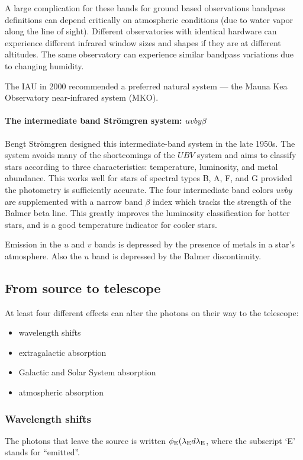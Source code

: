 A large complication for these bands for ground based observations
bandpass definitions can depend critically on atmospheric conditions
(due to water vapor along the line of sight). Different observatories
with identical hardware can experience different infrared window sizes
and shapes if they are at different altitudes. The same observatory
can experience similar bandpass variations due to changing humidity. 

The IAU in 2000 recommended a preferred natural system --- the Mauna
Kea Observatory near-infrared system (MKO).
\paragraph{The intermediate band Str\"omgren system: $uvby\beta$}
Bengt Str\"omgren designed this intermediate-band system in the late
1950s. The system avoids many of the shortcomings of the $UBV$ system
and aims to classify stars according to three characteristics:
temperature, luminosity, and metal abundance. This works well for
stars of spectral types B, A, F, and G provided the photometry is
sufficiently accurate. The four intermediate band colors $uvby$ are
supplemented with a narrow band $\beta$ index which tracks the
strength of the Balmer beta line. This greatly improves the
luminosity classification for hotter stars, and is a good temperature
indicator for cooler stars.

Emission in the $u$ and $v$ bands is depressed by the presence of
metals in a star's atmosphere. Also the $u$ band is depressed by the
Balmer discontinuity. 

\subsection{From source to telescope}
At least four different effects can alter the photons on their way to
the telescope:
\begin{itemize}
\item wavelength shifts
\item extragalactic absorption
\item Galactic and Solar System absorption
\item atmospheric absorption
\end{itemize}
\subsubsection{Wavelength shifts}
The photons that leave the source is written $\phi_{\rm
  E}(\lambda_{\rm E}d\lambda_{\rm E}$, where the subscript `E' stands
for ``emitted''. 

